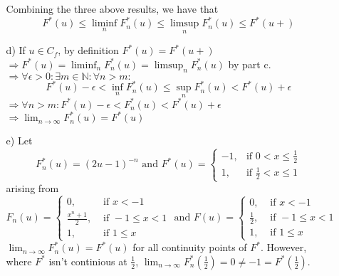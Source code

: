 \documentclass[11pt]{article}
\newcommand{\N}{\mathbb{N}}
\theoremstyle{definition}
\begin{document}
\begin{itemize}
\begin{itemize}
                Combining the three above results, we have that 
                \[  F^*(u) \leq \liminf_n F_n^*(u) \leq \limsup_n F_n^*(u) \leq F^*(u+) \]
            \item[d)]
                If \(u\in C_f\), by definition \(F^*(u) = F^*(u+)\) \\
                \( \Rightarrow F^*(u) = \liminf_n F_n^*(u) = \limsup_n F_n^*(u) \) by part c. \\
                \( \Rightarrow \forall \epsilon>0: \exists m\in\N: \forall n>m: \) \\
                \[ F^*(u) - \epsilon < \inf_n F_n^*(u) \leq \sup_n F_n^*(u) < F^*(u) + \epsilon \]
                \( \Rightarrow \forall n>m : F^*(u) - \epsilon < F_n^*(u) < F^*(u) + \epsilon \) \\
                \( \Rightarrow \lim_{n\to\infty} F_n^*(u) = F^*(u) \)
            \item[e)]
                Let
                \[F_n^*(u) = (2u-1)^{-n} \mbox{ and } F^*(u) = 
                    \begin{cases}
                        -1, &\mbox{if } 0<x\leq\frac{1}{2} \\
                         1, &\mbox{if } \frac{1}{2}<x\leq1 
                    \end{cases}
                \]
                arising from 
                \[F_n(u) =
                    \begin{cases}
                        0,               &\mbox{ if } x<-1        \\
                        \frac{x^n+1}{2}, &\mbox{ if } -1\leq x< 1 \\
                        1,               &\mbox{ if } 1 \leq x
                    \end{cases}
                \mbox{ and } F(u) =
                    \begin{cases}
                        0,               &\mbox{ if } x<-1        \\
                        \frac{1}{2},     &\mbox{ if } -1\leq x< 1 \\
                        1,               &\mbox{ if } 1 \leq x
                    \end{cases}
                \]
                \( \lim_{n\to\infty} F_n^*(u) = F^*(u) \) for all continuity points of $F^*$. However, where $F^*$ isn't continious at $\frac{1}{2}$, 
                \(\lim_{n\to\infty} F_n^*(\frac{1}{2}) = 0 \neq -1 = F^*(\frac{1}{2})\).
        \end{itemize}

\end{itemize}
\end{document}
